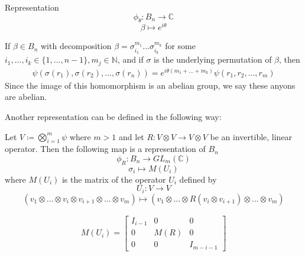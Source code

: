 \documentclass[compress,aspectratio=169,10pt,usenames,dvipsnames]{beamer}
\newcommand{\N}{\mathbb{N}}
\newcommand{\C}{\mathbb{C}}
\begin{document}
\begin{frame}
\vfill
\begin{block}{Representation}
$$\phi_\theta:B_n\rightarrow \C$$
$$\beta\mapsto e^{i\theta}$$
\end{block}
\vfill
If $\beta\in B_n$ with decomposition $\beta = \sigma^{m_1}_{i_1}\hdots\sigma^{m_k}_{i_k}$ for some $i_1,\hdots,i_k\in\{1,\hdots,n-1\},m_j\in\N$, and if $\sigma$ is the underlying permutation of $\beta$, then
\begin{equation}
	\begin{aligned}
		\psi(\sigma(r_1),\sigma(r_2),\hdots,\sigma(r_n)) = e^{i\theta(m_1+\hdots+m_k)} \psi(r_1,r_2,\hdots,r_m)
	\end{aligned}
\end{equation}
\vfill
Since the image of this homomorphism is an abelian group, we say these anyons are abelian.
\end{frame}

%
\begin{frame}
\vfill
Another representation can be defined in the following way:
\begin{theorem}
	Let $V \coloneq \bigotimes_{i=1}^m\psi$ where $m>1$ and let $R: V\otimes V \rightarrow V\otimes V $ be an invertible, linear operator. Then the following map is a representation of $B_n$
$$\phi_R:B_n\rightarrow GL_m(\C)$$
$$\sigma_i \mapsto M(U_i)$$
where $M(U_i)$ is the matrix of the operator $U_i$ defined by
$$U_i:V\rightarrow V$$
$$(v_1\otimes\hdots\otimes v_i\otimes v_{i+1}\otimes\hdots\otimes v_m)\mapsto (v_1\otimes\hdots\otimes R(v_i\otimes v_{i+1})\otimes\hdots\otimes v_m)$$
\end{theorem}
\vfill
\begin{equation}
	\begin{aligned}
		M(U_i) = \begin{bmatrix}
						I_{i-1} & 0 & 0 \\
						0 & M(R) & 0 \\
						0 & 0 & I_{m - i - 1}
					\end{bmatrix}
	\end{aligned}
\end{equation}
\vfill
\end{frame}
\end{document}
